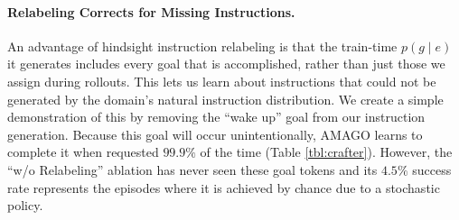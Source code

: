 \documentclass{article}
\begin{document}
\paragraph{Relabeling Corrects for Missing Instructions.} An advantage of hindsight instruction relabeling is that the train-time $p(g \mid e)$ it generates includes every goal that is accomplished, rather than just those we assign during rollouts. This lets us learn about instructions that could not be generated by the domain's natural instruction distribution. We create a simple demonstration of this by removing the ``wake up'' goal from our instruction generation. Because this goal will occur unintentionally, AMAGO learns to complete it when requested $99.9\%$ of the time (Table \ref{tbl:crafter}). However, the ``w/o Relabeling'' ablation has never seen these goal tokens and its $4.5\%$ success rate represents the episodes where it is achieved by chance due to a stochastic policy.
\end{document}
